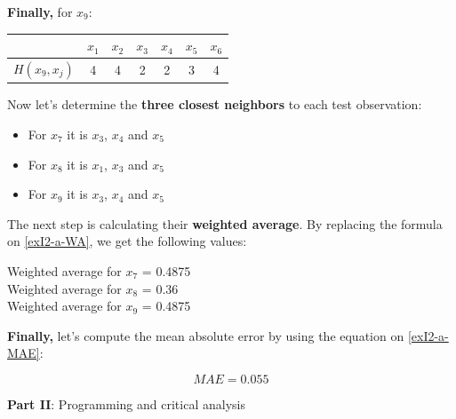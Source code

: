 \documentclass[12pt]{article}
\begin{document}
\begin{enumerate}[leftmargin=\labelsep]
\begin{enumerate}
          \textbf{Finally,} for $x_9$:

          \begin{center}
            \begin{tabular}{c|cccccc}
                               & \(x_1\) & \(x_2\) & \(x_3\) & \(x_4\) & \(x_5\) &\(x_6\) \\
                \hline
                \(H(x_9,x_j)\) & 4 & 4 & 2 & 2 & 3 & 4 \\
            \end{tabular}
          \end{center}

          Now let's determine the \textbf{three closest neighbors} to each test observation:

          \begin{itemize}
            \item For $x_7$ it is $x_3$, $x_4$ and $x_5$
            \item For $x_8$ it is $x_1$, $x_3$ and $x_5$
            \item For $x_9$ it is $x_3$, $x_4$ and $x_5$
          \end{itemize}

          The next step is calculating their \textbf{weighted average}. By replacing the
           formula on \eqref{exI2-a-WA}, we get the following values:

          \begin{center}
            Weighted average for $x_7$ = 0.4875 \\
            Weighted average for $x_8$ = 0.36   \\
            Weighted average for $x_9$ = 0.4875 \\
          \end{center}

          \textbf{Finally,} let's compute the mean absolute error by using the equation
           on \eqref{exI2-a-MAE}:

           \begin{equation*}
            MAE = 0.055
           \end{equation*}

          \end{enumerate}
\end{enumerate}

\vskip 0.5cm

\begin{center}
\large{\textbf{Part II}: Programming and critical analysis}\normalsize
\end{center}
\end{document}
